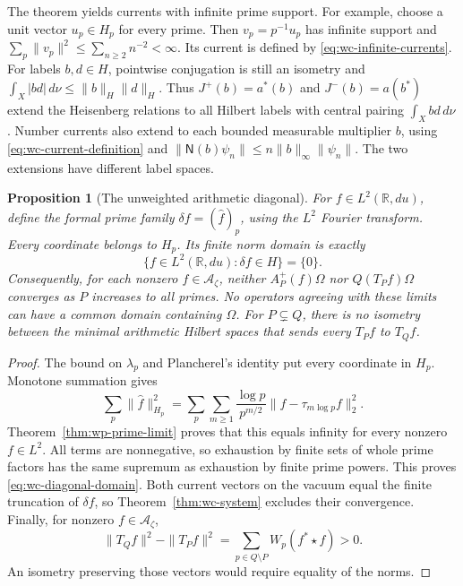 \documentclass[11pt]{article}
\newtheorem{proposition}[theorem]{Proposition}
\theoremstyle{definition}
\theoremstyle{remark}
\numberwithin{equation}{section}
\newcommand{\cA}{\mathcal A}
\newcommand{\R}{\mathbb R}
\begin{document}
The theorem yields currents with infinite prime support.
For example, choose a unit vector $u_p\in H_p$ for every prime.
Then $v_p=p^{-1}u_p$ has infinite support and
$\sum_p\|v_p\|^2\leq\sum_{n\geq2}n^{-2}<\infty$.
Its current is defined by \eqref{eq:wc-infinite-currents}.
For labels $b,d\in H$, pointwise conjugation is still an isometry and
$\int_X|bd|\,d\nu\leq\|b\|_H\|d\|_H$.
Thus $J^+(b)=a^*(b)$ and $J^-(b)=a(b^*)$ extend the Heisenberg
relations to all Hilbert labels with central pairing $\int_Xbd\,d\nu$.
Number currents also extend to each bounded measurable multiplier $b$,
using \eqref{eq:wc-current-definition} and
$\|\mathsf N(b)\psi_n\|\leq n\|b\|_\infty\|\psi_n\|$.
The two extensions have different label spaces.

\begin{proposition}[The unweighted arithmetic diagonal]
\label{prop:wc-diagonal-barrier}
For $f\in L^2(\R,du)$, define the formal prime family
$\delta f=(\widehat f)_p$, using the $L^2$ Fourier transform.
Every coordinate belongs to $H_p$.
Its finite norm domain is exactly
\begin{equation}
 \{f\in L^2(\R,du):\delta f\in H\}=\{0\}.
 \label{eq:wc-diagonal-domain}
\end{equation}
Consequently, for each nonzero $f\in\cA_\zeta$, neither
$A_P^+(f)\Omega$ nor $Q(T_Pf)\Omega$ converges as $P$ increases to
all primes.  No operators agreeing with these limits can have a common
domain containing $\Omega$.
For $P\subsetneq Q$, there is no isometry between the minimal
arithmetic Hilbert spaces that sends every $T_Pf$ to $T_Qf$.
\end{proposition}
\begin{proof}
The bound on $\lambda_p$ and Plancherel's identity put every coordinate
in $H_p$.  Monotone summation gives
\[
 \sum_p\|\widehat f\|_{H_p}^2
 =\sum_p\sum_{m\geq1}\frac{\log p}{p^{m/2}}
 \|f-\tau_{m\log p}f\|_2^2.
\]
Theorem~\ref{thm:wp-prime-limit} proves that this equals infinity for
every nonzero $f\in L^2$.
All terms are nonnegative, so exhaustion by finite sets of whole prime
factors has the same supremum as exhaustion by finite prime powers.
This proves \eqref{eq:wc-diagonal-domain}.
Both current vectors on the vacuum equal the finite truncation of
$\delta f$, so Theorem~\ref{thm:wc-system} excludes their convergence.
Finally, for nonzero $f\in\cA_\zeta$,
\[
 \|T_Qf\|^2-\|T_Pf\|^2
 =\sum_{p\in Q\setminus P}W_p(f^*\star f)>0.
\]
An isometry preserving those vectors would require equality of the norms.
\end{proof}
\end{document}
